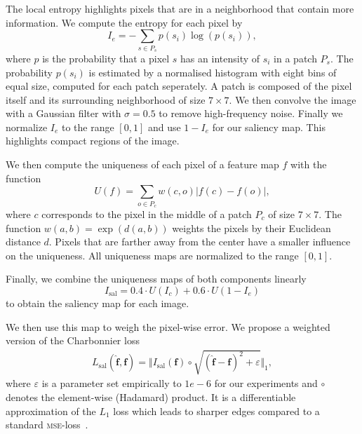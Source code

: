 \documentclass{scrartcl}
\newcommand{\img}{\bm{f}} %
\begin{document}
The local entropy highlights pixels that are in a neighborhood that contain more information.
We compute the entropy for each pixel by
\begin{equation}
  \label{eq:entr}
  I_e = - \sum_{s \in P_s} p(s_i) \log(p(s_i)),
\end{equation}
where \(p\) is the probability that a pixel \(s\) has an intensity of \(s_i\) in a patch \(P_s\).
The probability $p(s_i)$ is estimated by a normalised histogram with eight bins of equal size, computed for each patch seperately.
A patch is composed of the pixel itself and its surrounding neighborhood of size \(7 \times 7\).
We then convolve the image with a Gaussian filter with \(\sigma = 0.5\) to remove high-frequency noise.
Finally we normalize $I_e$ to the range \([0, 1]\) and use $1 - I_e$ for our saliency map.
This highlights compact regions of the image.

We then compute the uniqueness of each pixel of a feature map \(f\) with the function
\begin{equation}
  \label{eq:uniq}
  U(f) = \sum_{o \in P_c} w(c, o) \vert f(c) - f(o) \vert,
\end{equation}
where \(c\) corresponds to the pixel in the middle of a patch \(P_c\) of size \(7 \times 7\).
The function \(w(a,b) = \exp(d(a, b))\) weights the pixels by their Euclidean distance \(d\).
Pixels that are farther away from the center have a smaller influence on the uniqueness.
All uniqueness maps are normalized to the range \([0,1]\).

Finally, we combine the uniqueness maps of both components linearly
\begin{equation}
  \label{eq:saliency}
  I_{\text{sal}} = 0.4 \cdot U(I_c) + 0.6 \cdot U(1 - I_e)
\end{equation}
to obtain the saliency map for each image.

We then use this map to weigh the pixel-wise error.
We propose a weighted version of the Charbonnier loss
\begin{align}
\label{eq:charbonnier}
  L_{\text{sal}}( \hat{\bm{\img}}, \bm{\img}) = \Vert I_{\text{sal}}(\img) \circ \sqrt{ (\hat{\img} - \img)^2 + \varepsilon} \Vert_1,
\end{align}
where $\varepsilon$ is a parameter set empirically to $1e-6$ for our experiments and \(\circ\) denotes the element-wise (Hadamard) product.
It is a differentiable approximation of the $L_1$ loss which leads to sharper edges compared to a standard \textsc{mse}-loss~\cite{LapSRN}.
\end{document}
